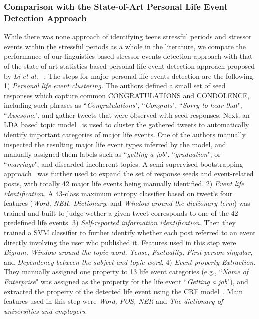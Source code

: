 \subsubsection{Comparison with the State-of-Art Personal Life Event Detection Approach}
While there was none approach of identifying teens stressful periods and stressor events within the stressful periods as a whole in the
literature, we compare the performance of our linguistics-based stressor events detection approach with that of
the state-of-art statistics-based personal life event detection approach proposed by \emph{ Li et al.} ~\cite{DBLP:conf/emnlp/LiRCH14}.
The steps for major personal life events detection are the following.
1) \emph{Personal life event clustering.} The authors defined a small set of seed responses which capture common
CONGRATULATIONS and CONDOLENCE, including such phrases as
``\emph{Congratulations}", ``\emph{Congrats}", ``\emph{Sorry to hear that}", ``\emph{Awesome}", and
gather tweets that were observed with seed responses. Next, an LDA based topic model~\cite{DBLP:journals/jmlr/BleiNJ03} is used to
cluster the gathered tweets to automatically identify important categories of major life
events. One of the authors manually inspected the resulting major life event types inferred by
the model, and manually assigned them labels such as
``\emph{getting a job}", ``\emph{graduation}", or ``\emph{marriage}", and discarded incoherent topics.
A semi-supervised bootstrapping approach~\cite{DBLP:conf/naacl/KozarevaH10} was further used to expand the set of response seeds and event-related posts,
with totally 42 major life events being manually identified.
2) \emph{Event life identification.}
A 43-class maximum entropy classifier based on tweet's four features (\emph{Word, NER, Dictionary}, and \emph{Window around the dictionary term})
was trained and built to judge wether a given tweet corresponds to one of the 42 predefined life events.
3) \emph{Self-reported information identification.}
Then they trained a SVM classifier to further identify whether each post referred to an event directly involving the user who published it.
Features used in this step were \emph{Bigram, Window around the topic word, Tense, Factuality, First}
\emph{person singular}, and \emph{Dependency between the subject and topic word}.
4) \emph{Event property Extraction}.
They manually assigned one property to 13 life event categories
(e.g., ``\emph{Name of Enterprise}" was assigned as the property for the life event ``\emph{Getting a job}"),
and extracted the property of the detected life event using the CRF model~\cite{DBLP:conf/icml/LaffertyMP01}.
Main features used in this step were \emph{Word, POS, NER} and \emph{The dictionary of universities and employers}.


